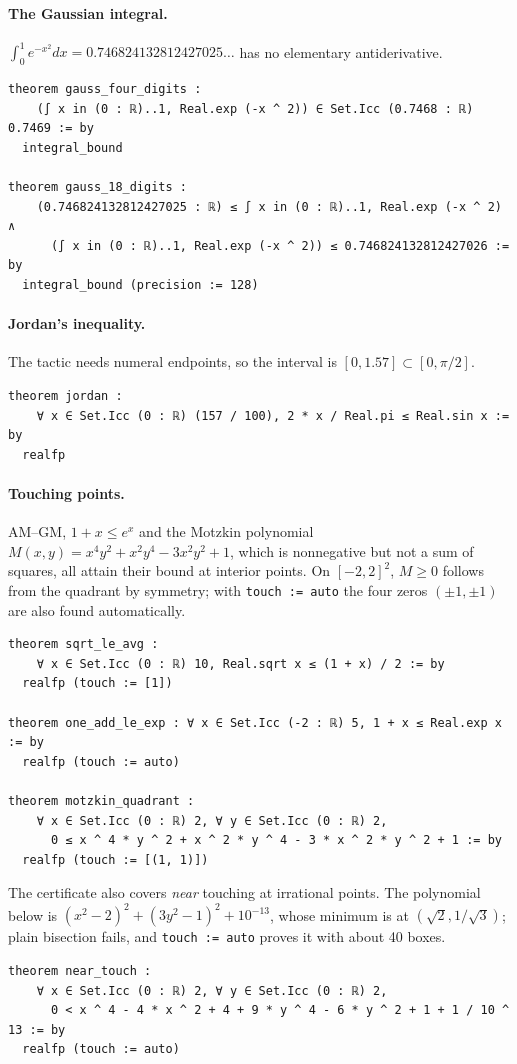 \documentclass[11pt]{article}
\theoremstyle{definition}
\theoremstyle{remark}
\newcommand{\lean}[1]{\texttt{#1}}
\begin{document}
\paragraph{The Gaussian integral.} $\int_0^1 e^{-x^2}dx=0.746824132812427025\ldots$
has no elementary antiderivative.
\begin{lstlisting}
theorem gauss_four_digits :
    (∫ x in (0 : ℝ)..1, Real.exp (-x ^ 2)) ∈ Set.Icc (0.7468 : ℝ) 0.7469 := by
  integral_bound

theorem gauss_18_digits :
    (0.746824132812427025 : ℝ) ≤ ∫ x in (0 : ℝ)..1, Real.exp (-x ^ 2) ∧
      (∫ x in (0 : ℝ)..1, Real.exp (-x ^ 2)) ≤ 0.746824132812427026 := by
  integral_bound (precision := 128)
\end{lstlisting}

\paragraph{Jordan's inequality.} The tactic needs numeral endpoints, so the
interval is $[0,1.57]\subset[0,\pi/2]$.
\begin{lstlisting}
theorem jordan :
    ∀ x ∈ Set.Icc (0 : ℝ) (157 / 100), 2 * x / Real.pi ≤ Real.sin x := by
  realfp
\end{lstlisting}

\paragraph{Touching points.} AM--GM, $1+x\le e^x$ and the Motzkin
polynomial~\cite{motzkin1967} $M(x,y)=x^4y^2+x^2y^4-3x^2y^2+1$, which is
nonnegative but not a sum of squares, all attain their bound at interior
points. On $[-2,2]^2$, $M\ge0$ follows from the quadrant by symmetry; with
\lean{touch := auto} the four zeros $(\pm1,\pm1)$ are also found
automatically.
\begin{lstlisting}
theorem sqrt_le_avg :
    ∀ x ∈ Set.Icc (0 : ℝ) 10, Real.sqrt x ≤ (1 + x) / 2 := by
  realfp (touch := [1])

theorem one_add_le_exp : ∀ x ∈ Set.Icc (-2 : ℝ) 5, 1 + x ≤ Real.exp x := by
  realfp (touch := auto)

theorem motzkin_quadrant :
    ∀ x ∈ Set.Icc (0 : ℝ) 2, ∀ y ∈ Set.Icc (0 : ℝ) 2,
      0 ≤ x ^ 4 * y ^ 2 + x ^ 2 * y ^ 4 - 3 * x ^ 2 * y ^ 2 + 1 := by
  realfp (touch := [(1, 1)])
\end{lstlisting}
The certificate also covers \emph{near} touching at irrational points. The
polynomial below is $(x^2-2)^2+(3y^2-1)^2+10^{-13}$, whose minimum is at
$(\sqrt2,1/\sqrt3)$; plain bisection fails, and \lean{touch := auto} proves
it with about 40 boxes.
\begin{lstlisting}
theorem near_touch :
    ∀ x ∈ Set.Icc (0 : ℝ) 2, ∀ y ∈ Set.Icc (0 : ℝ) 2,
      0 < x ^ 4 - 4 * x ^ 2 + 4 + 9 * y ^ 4 - 6 * y ^ 2 + 1 + 1 / 10 ^ 13 := by
  realfp (touch := auto)
\end{lstlisting}
\end{document}
